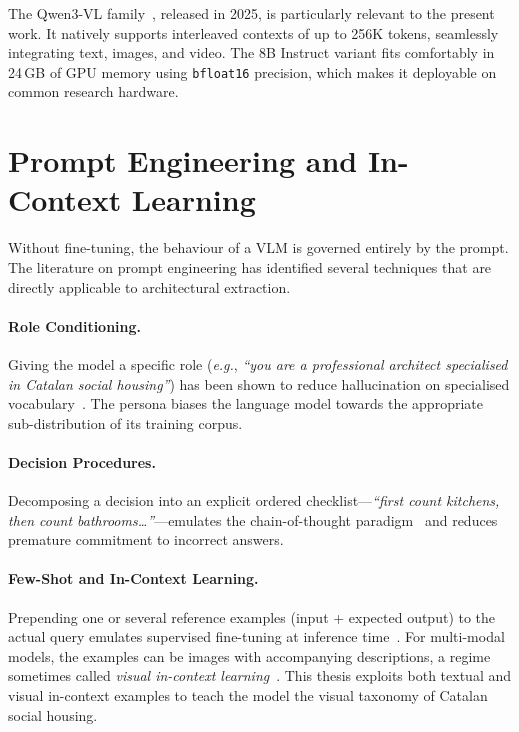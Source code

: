 \documentclass[12pt,a4paper,openright]{report}
\newcommand{\eg}{\textit{e.g.}}
\newcommand{\code}[1]{\texttt{#1}}
\begin{document}
The Qwen3-VL family~\cite{qwen3technicalreport}, released in 2025, is particularly relevant to the present work. It natively supports interleaved contexts of up to 256K tokens, seamlessly integrating text, images, and video. The 8B Instruct variant fits comfortably in 24\,GB of GPU memory using \code{bfloat16} precision, which makes it deployable on common research hardware.

\section{Prompt Engineering and In-Context Learning}

Without fine-tuning, the behaviour of a VLM is governed entirely by the prompt. The literature on prompt engineering has identified several techniques that are directly applicable to architectural extraction.

\paragraph{Role Conditioning.} Giving the model a specific role (\eg, \textit{``you are a professional architect specialised in Catalan social housing''}) has been shown to reduce hallucination on specialised vocabulary~\cite{kong2024betterzeroshotreasoningroleplay}. The persona biases the language model towards the appropriate sub-distribution of its training corpus.

\paragraph{Decision Procedures.} Decomposing a decision into an explicit ordered checklist---\textit{``first count kitchens, then count bathrooms\ldots''}---emulates the chain-of-thought paradigm~\cite{wei2023chainofthoughtpromptingelicitsreasoning} and reduces premature commitment to incorrect answers.

\paragraph{Few-Shot and In-Context Learning.} Prepending one or several reference examples (input + expected output) to the actual query emulates supervised fine-tuning at inference time~\cite{brown2020languagemodelsfewshotlearners}. For multi-modal models, the examples can be images with accompanying descriptions, a regime sometimes called \textit{visual in-context learning}~\cite{bai2023sequentialmodelingenablesscalable}. This thesis exploits both textual and visual in-context examples to teach the model the visual taxonomy of Catalan social housing.
\end{document}
